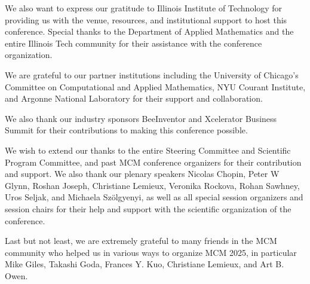 We also want to express our gratitude to Illinois Institute of Technology for providing us with the venue, resources, and institutional support to host this conference. Special thanks to the Department of Applied Mathematics and the entire Illinois Tech community for their assistance with the conference organization.

We are grateful to our partner institutions including the University of Chicago's Committee on Computational and Applied Mathematics, NYU Courant Institute, and Argonne National Laboratory for their support and collaboration.

We also thank our industry sponsors BeeInventor and Xcelerator Business Summit for their contributions to making this conference possible.

We wish to extend our thanks to the entire Steering Committee and
Scientific Program Committee, and past MCM conference organizers for their
contribution and support. We also thank our plenary speakers Nicolas Chopin, Peter W Glynn, Roshan Joseph, Christiane Lemieux, Veronika Rockova, Rohan Sawhney, Uros Seljak, and Michaela Szölgyenyi, as well as all special session organizers and session chairs for their help and support with the scientific organization of the conference.

Last but not least, we are extremely grateful to many friends in the MCM community 
who helped us in various ways to organize MCM 2025, in particular Mike Giles, 
Takashi Goda, Frances Y. Kuo, Christiane Lemieux, and Art B. Owen. 

\clearpage

